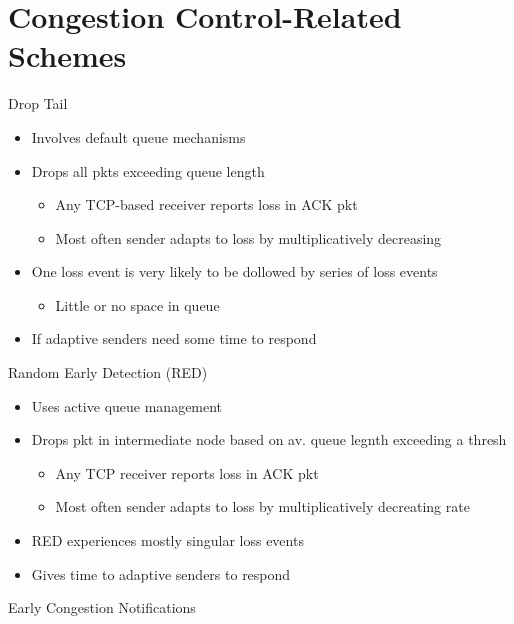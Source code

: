 \documentclass[a4paper]{article}
\begin{document}
\section{Congestion Control-Related Schemes}
Drop Tail
\begin{itemize}
	\item Involves default queue mechanisms
	\item Drops all pkts exceeding queue length
	\begin{itemize}
		\item Any TCP-based receiver reports loss in ACK pkt
		\item Most often sender adapts to loss by multiplicatively
			decreasing
	\end{itemize}
	\item One loss event is very likely to be dollowed by series of loss
		events
	\begin{itemize}
		\item Little or no space in queue
	\end{itemize}
	\item If adaptive senders need some time to respond
\end{itemize}
Random Early Detection (RED)
\begin{itemize}
	\item Uses active queue management
	\item Drops pkt in intermediate node based on av. queue legnth exceeding
		a thresh
	\begin{itemize}
		\item Any TCP receiver reports loss in ACK pkt
		\item Most often sender adapts to loss by multiplicatively
			decreating rate
	\end{itemize}
	\item RED experiences mostly singular loss events
	\item Gives time to adaptive senders to respond
\end{itemize}
Early Congestion Notifications
\end{document}
